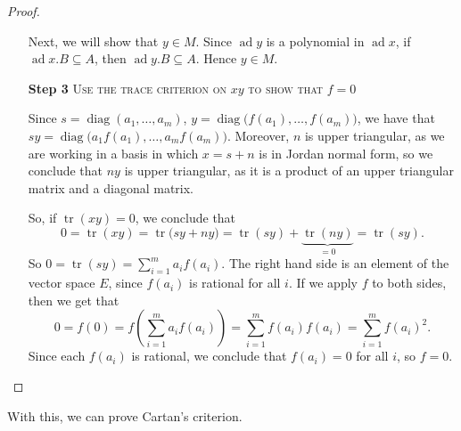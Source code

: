 \documentclass{article}
\DeclareMathOperator{\tr}{tr}
\DeclareMathOperator{\diag}{diag}
\DeclareMathOperator{\ad}{ad}
\begin{document}
\begin{proof}
\begin{itemize}
            Next, we will show that $y \in M$.
            Since $\ad y$ is a polynomial in $\ad x$, if $\ad x.B \subseteq A$, then $\ad y.B \subseteq A$.
            Hence $y \in M$.

        \item[\textbf{Step 3}]
            \textsc{\color{Crimson} Use the trace criterion on $xy$ to show that $f = 0$}

            Since $s = \diag(a_1,\ldots,a_m)$, $y = \diag\big(f(a_1),\ldots,f(a_m)\big)$, we have that $sy = \diag\big(a_1f(a_1),\ldots,a_mf(a_m)\big)$.
            Moreover, $n$ is upper triangular, as we are working in a basis in which $x = s+n$ is in Jordan normal form, so we conclude that $ny$ is upper triangular, as it is a product of an upper triangular matrix and a diagonal matrix.

            So, if $\tr(xy) = 0$, we conclude that 
            \[
                0
                =
                \tr(xy)
                =
                \tr\big(sy + ny\big)
                =
                \tr(sy) + \underbrace{\tr(ny)}_{=0}
                =
                \tr(sy).
            \]
            So $0 = \tr(sy) = \sum_{i=1}^m a_if(a_i)$.
            The right hand side is an element of the vector space $E$, since $f(a_i)$ is rational for all $i$.
            If we apply $f$ to both sides, then we get that 
            \[
                0
                =
                f(0)
                =
                f\left(
                    \sum_{i=1}^m
                    a_if(a_i)
                \right)
                =
                \sum_{i=1}^m
                f(a_i)
                f(a_i)
                =
                \sum_{i=1}^mf(a_i)^2.
            \]
            Since each $f(a_i)$ is rational, we conclude that $f(a_i) = 0$ for all $i$, so $f = 0$.
    \end{itemize}
\end{proof}

With this, we can prove Cartan's criterion.
\end{document}
